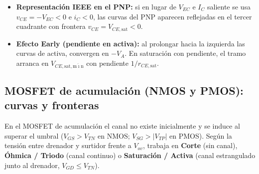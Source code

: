\documentclass[11pt,a4paper]{article}
\begin{document}
	\begin{tcolorbox}[notebox, unbreakable, title={Simetría PNP y efecto Early ($V_A$)}, top=10pt]
		\begin{itemize}[itemsep=0.2em, topsep=0.2em]
			\item \textbf{Representación IEEE en el PNP:} si en lugar de $V_{EC}$ e $I_C$ saliente se usa $v_{CE} = -V_{EC} < 0$ e $i_C < 0$, las curvas del PNP aparecen reflejadas en el tercer cuadrante con frontera $v_{CE} = V_{CE,\mathrm{sat}} < 0$.
			\item \textbf{Efecto Early (pendiente en activa):} al prolongar hacia la izquierda las curvas de activa, convergen en $-V_A$. En saturación con pendiente, el tramo arranca en $V_{CE,\mathrm{sat,m\acute{\imath}n}}$ con pendiente $1/r_{CE,\mathrm{sat}}$.
		\end{itemize}
	\end{tcolorbox}

	\subsection{MOSFET de acumulación (NMOS y PMOS): curvas y fronteras}

	En el MOSFET de acumulación el canal no existe inicialmente y se induce al superar el umbral ($V_{GS} > V_{TN}$ en NMOS; $V_{SG} > |V_{TP}|$ en PMOS). Según la tensión entre drenador y surtidor frente a $V_{ov}$, trabaja en \textbf{Corte} (sin canal), \textbf{Óhmica / Triodo} (canal continuo) o \textbf{Saturación / Activa} (canal estrangulado junto al drenador, $V_{GD} \le V_{TN}$).
\end{document}
